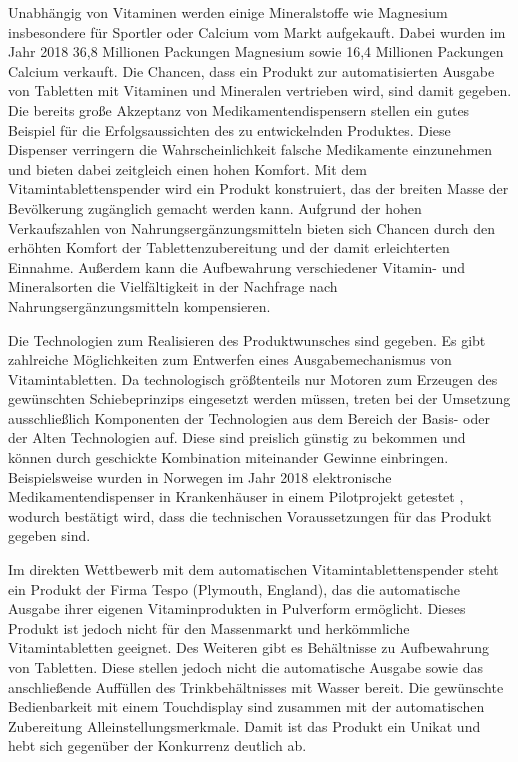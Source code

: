 Unabhängig von Vitaminen werden einige Mineralstoffe wie Magnesium insbesondere für Sportler oder Calcium vom Markt aufgekauft. Dabei wurden im Jahr 2018 36,8 Millionen Packungen Magnesium sowie 16,4 Millionen Packungen Calcium verkauft. Die Chancen, dass ein Produkt zur automatisierten Ausgabe von Tabletten mit Vitaminen und Mineralen vertrieben wird, sind damit gegeben. Die bereits große Akzeptanz von Medikamentendispensern stellen ein gutes Beispiel für die Erfolgsaussichten des zu entwickelnden Produktes. Diese Dispenser verringern die Wahrscheinlichkeit falsche Medikamente einzunehmen und bieten dabei zeitgleich einen hohen Komfort. Mit dem Vitamintablettenspender wird ein Produkt konstruiert, das der breiten Masse der Bevölkerung zugänglich gemacht werden kann. Aufgrund der hohen Verkaufszahlen von Nahrungsergänzungsmitteln bieten sich Chancen durch den erhöhten Komfort der Tablettenzubereitung und der damit erleichterten Einnahme. Außerdem kann die Aufbewahrung verschiedener Vitamin- und Mineralsorten die Vielfältigkeit in der Nachfrage nach Nahrungsergänzungsmitteln kompensieren.

Die Technologien zum Realisieren des Produktwunsches sind gegeben. Es gibt zahlreiche Möglichkeiten zum Entwerfen eines Ausgabemechanismus von Vitamintabletten. Da technologisch größtenteils nur Motoren zum Erzeugen des gewünschten Schiebeprinzips eingesetzt werden müssen, treten bei der Umsetzung ausschließlich Komponenten der Technologien aus dem Bereich der Basis- oder der Alten Technologien auf. Diese sind preislich günstig zu bekommen und können durch geschickte Kombination miteinander Gewinne einbringen. Beispielsweise wurden in Norwegen im Jahr 2018 elektronische Medikamentendispenser in Krankenhäuser in einem Pilotprojekt getestet \cite{studie2}, wodurch bestätigt wird, dass die technischen Voraussetzungen für das Produkt gegeben sind.

Im direkten Wettbewerb mit dem automatischen Vitamintablettenspender steht ein Produkt der Firma Tespo (Plymouth, England), das die automatische Ausgabe ihrer eigenen Vitaminprodukten in Pulverform ermöglicht. Dieses Produkt ist jedoch nicht für den Massenmarkt und herkömmliche Vitamintabletten geeignet. Des Weiteren gibt es Behältnisse zu Aufbewahrung von Tabletten. Diese stellen jedoch nicht die automatische Ausgabe sowie das anschließende Auffüllen des Trinkbehältnisses mit Wasser bereit. Die gewünschte Bedienbarkeit mit einem Touchdisplay sind zusammen mit der automatischen Zubereitung Alleinstellungsmerkmale. Damit ist das Produkt ein Unikat und hebt sich gegenüber der Konkurrenz deutlich ab.

